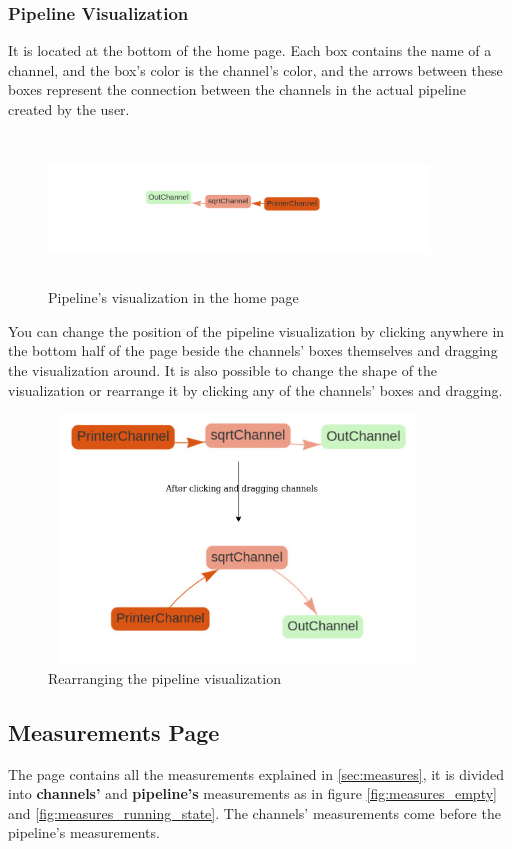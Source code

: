 \subsubsection{Pipeline Visualization}
It is located at the bottom of the home page. Each box contains the name of a channel, and the box's color is the
channel's color, and the arrows between these boxes represent the connection between the channels in the
actual pipeline created by the user.
\newline
\begin{figure}[H]
	\centering
	\includegraphics[width=0.9\textwidth,height=150px]{images/pipeline_viz.png}
	\caption{Pipeline's visualization in the home page}
	\label{fig:pipeline_viz_home_page}
\end{figure}

You can change the position of the pipeline visualization by clicking anywhere in the bottom half of the page
beside the channels' boxes themselves and dragging the visualization around. It is also possible to change the 
shape of the visualization or rearrange it by clicking any of the channels' boxes and dragging.
\newline
\begin{figure}[H]
	\centering
	\includegraphics[width=0.9\textwidth,height=250px]{images/moving_viz_graph.jpg}
	\caption{Rearranging the pipeline visualization}
	\label{fig:remving_channel_graph}
\end{figure}

\subsection{Measurements Page}
The page contains all the measurements explained in \ref{sec:measures}, it is divided into \textbf{channels'} and
\textbf{pipeline's} measurements as in figure \ref{fig:measures_empty} and \ref{fig:measures_running_state}. The
channels' measurements come before the pipeline's measurements.

